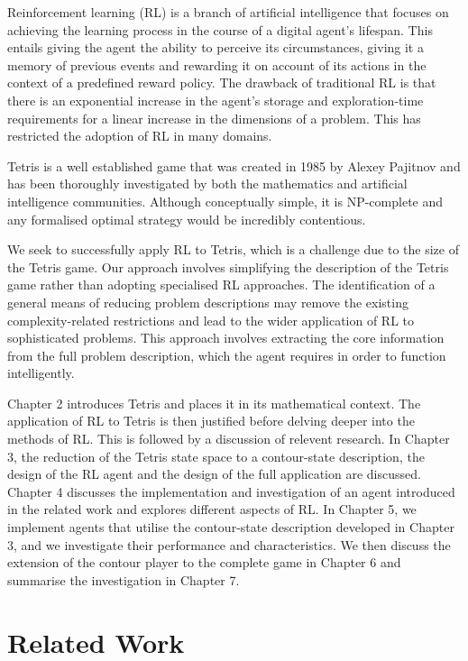 \documentclass{rucsthesis}
\begin{document}
Reinforcement learning (RL) is a branch of artificial intelligence that focuses on achieving the learning process in the course of a digital agent's lifespan. This entails giving the agent the ability to perceive its circumstances, giving it a memory of previous events and rewarding it on account of its actions in the context of a predefined reward policy. The drawback of traditional RL is that there is an exponential increase in the agent's storage and exploration-time requirements for a linear increase in the dimensions of a problem. This has restricted the adoption of RL in many domains.

Tetris is a well established game that was created in 1985 by Alexey Pajitnov and has been thoroughly investigated by both the mathematics and artificial intelligence communities. Although conceptually simple, it is NP-complete \citep{hardtet} and any formalised optimal strategy would be incredibly contentious. 

We seek to successfully apply RL to Tetris, which is a challenge due to the size of the Tetris game. Our approach involves simplifying the description of the Tetris game rather than adopting specialised RL approaches. The identification of a general means of reducing problem descriptions may remove the existing complexity-related restrictions and lead to the wider application of RL to sophisticated problems. This approach involves extracting the core information from the full problem description, which the agent requires in order to function intelligently. 

Chapter 2 introduces Tetris and places it in its mathematical context. The application of RL to Tetris is then justified before delving deeper into the methods of RL. This is followed by a discussion of relevent research. In Chapter 3, the reduction of the Tetris state space to a contour-state description, the design of the RL agent and the design of the full application are discussed. Chapter 4 discusses the implementation and investigation of an agent introduced in the related work and explores different aspects of RL.  In Chapter 5, we implement agents that utilise the contour-state description developed in Chapter 3, and we investigate their performance and characteristics. We then discuss the extension of the contour player to the complete game in Chapter 6 and summarise the investigation in Chapter 7.

\chapter{Related Work}
\end{document}
